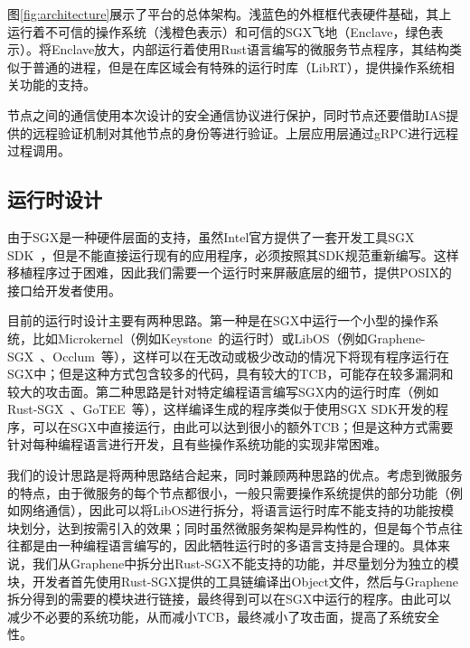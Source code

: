 图\ref{fig:architecture}展示了平台的总体架构。浅蓝色的外框框代表硬件基础，其上运行着不可信的操作系统（浅橙色表示）和可信的SGX飞地（Enclave，绿色表示）。将Enclave放大，内部运行着使用Rust语言编写的微服务节点程序，其结构类似于普通的进程，但是在库区域会有特殊的运行时库（LibRT），提供操作系统相关功能的支持。

节点之间的通信使用本次设计的安全通信协议进行保护，同时节点还要借助IAS提供的远程验证机制对其他节点的身份等进行验证。上层应用层通过gRPC进行远程过程调用。

\subsection{运行时设计}

由于SGX是一种硬件层面的支持，虽然Intel官方提供了一套开发工具SGX SDK~\cite{costan2016intel}，但是不能直接运行现有的应用程序，必须按照其SDK规范重新编写。这样移植程序过于困难，因此我们需要一个运行时来屏蔽底层的细节，提供POSIX的接口给开发者使用。

目前的运行时设计主要有两种思路。第一种是在SGX中运行一个小型的操作系统，比如Microkernel（例如Keystone~\cite{lee2020keystone}的运行时）或LibOS（例如Graphene-SGX~\cite{tsai2017graphene}、Occlum~\cite{shen2020occlum}等），这样可以在无改动或极少改动的情况下将现有程序运行在SGX中；但是这种方式包含较多的代码，具有较大的TCB，可能存在较多漏洞和较大的攻击面。第二种思路是针对特定编程语言编写SGX内的运行时库（例如Rust-SGX~\cite{wang2019towards}、GoTEE~\cite{ghosn2019secured}等），这样编译生成的程序类似于使用SGX SDK开发的程序，可以在SGX中直接运行，由此可以达到很小的额外TCB；但是这种方式需要针对每种编程语言进行开发，且有些操作系统功能的实现非常困难。

我们的设计思路是将两种思路结合起来，同时兼顾两种思路的优点。考虑到微服务的特点，由于微服务的每个节点都很小，一般只需要操作系统提供的部分功能（例如网络通信），因此可以将LibOS进行拆分，将语言运行时库不能支持的功能按模块划分，达到按需引入的效果；同时虽然微服务架构是异构性的，但是每个节点往往都是由一种编程语言编写的，因此牺牲运行时的多语言支持是合理的。具体来说，我们从Graphene中拆分出Rust-SGX不能支持的功能，并尽量划分为独立的模块，开发者首先使用Rust-SGX提供的工具链编译出Object文件，然后与Graphene拆分得到的需要的模块进行链接，最终得到可以在SGX中运行的程序。由此可以减少不必要的系统功能，从而减小TCB，最终减小了攻击面，提高了系统安全性。

